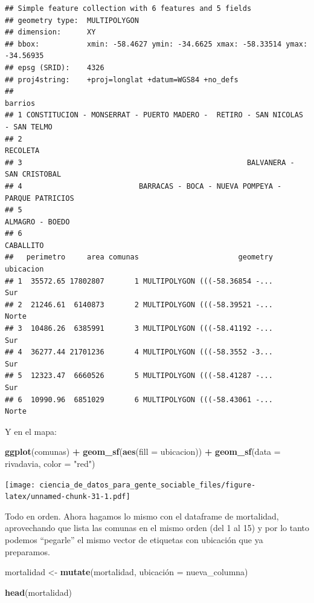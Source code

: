 \documentclass[spanish,]{book}
\newenvironment{Shaded}{\begin{snugshade}}{\end{snugshade}}
\newcommand{\DataTypeTok}[1]{\textcolor[rgb]{0.13,0.29,0.53}{#1}}
\newcommand{\KeywordTok}[1]{\textcolor[rgb]{0.13,0.29,0.53}{\textbf{#1}}}
\newcommand{\NormalTok}[1]{#1}
\newcommand{\OperatorTok}[1]{\textcolor[rgb]{0.81,0.36,0.00}{\textbf{#1}}}
\newcommand{\StringTok}[1]{\textcolor[rgb]{0.31,0.60,0.02}{#1}}
\begin{document}
\begin{verbatim}
## Simple feature collection with 6 features and 5 fields
## geometry type:  MULTIPOLYGON
## dimension:      XY
## bbox:           xmin: -58.4627 ymin: -34.6625 xmax: -58.33514 ymax: -34.56935
## epsg (SRID):    4326
## proj4string:    +proj=longlat +datum=WGS84 +no_defs
##                                                                        barrios
## 1 CONSTITUCION - MONSERRAT - PUERTO MADERO -  RETIRO - SAN NICOLAS - SAN TELMO
## 2                                                                     RECOLETA
## 3                                                    BALVANERA - SAN CRISTOBAL
## 4                           BARRACAS - BOCA - NUEVA POMPEYA - PARQUE PATRICIOS
## 5                                                              ALMAGRO - BOEDO
## 6                                                                    CABALLITO
##   perimetro     area comunas                       geometry ubicacion
## 1  35572.65 17802807       1 MULTIPOLYGON (((-58.36854 -...       Sur
## 2  21246.61  6140873       2 MULTIPOLYGON (((-58.39521 -...     Norte
## 3  10486.26  6385991       3 MULTIPOLYGON (((-58.41192 -...       Sur
## 4  36277.44 21701236       4 MULTIPOLYGON (((-58.3552 -3...       Sur
## 5  12323.47  6660526       5 MULTIPOLYGON (((-58.41287 -...       Sur
## 6  10990.96  6851029       6 MULTIPOLYGON (((-58.43061 -...     Norte
\end{verbatim}

Y en el mapa:

\begin{Shaded}
\begin{Highlighting}[]
\KeywordTok{ggplot}\NormalTok{(comunas) }\OperatorTok{+}
\StringTok{    }\KeywordTok{geom_sf}\NormalTok{(}\KeywordTok{aes}\NormalTok{(}\DataTypeTok{fill =}\NormalTok{ ubicacion)) }\OperatorTok{+}
\StringTok{    }\KeywordTok{geom_sf}\NormalTok{(}\DataTypeTok{data =}\NormalTok{ rivadavia, }\DataTypeTok{color =} \StringTok{"red"}\NormalTok{)}
\end{Highlighting}
\end{Shaded}

\texttt{[image: ciencia\_de\_datos\_para\_gente\_sociable\_files/figure-latex/unnamed-chunk-31-1.pdf]}

Todo en orden. Ahora hagamos lo mismo con el dataframe de mortalidad, aprovechando que lista las comunas en el mismo orden (del 1 al 15) y por lo tanto podemos ``pegarle'' el mismo vector de etiquetas con ubicación que ya preparamos.

\begin{Shaded}
\begin{Highlighting}[]
\NormalTok{mortalidad <-}\StringTok{ }\KeywordTok{mutate}\NormalTok{(mortalidad, ubicación =}\StringTok{ }\NormalTok{nueva_columna)}
                         
\KeywordTok{head}\NormalTok{(mortalidad)}
\end{Highlighting}
\end{Shaded}
\end{document}
